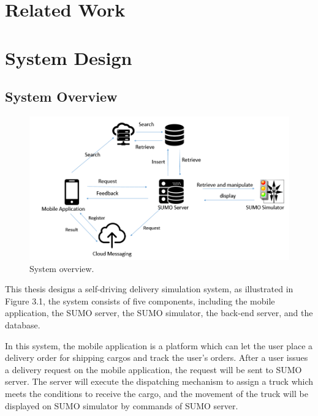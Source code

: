 \documentclass[12pt]{ksthesis}
\begin{document}
\begin{thesis}
{  


\chapter{Related Work} \label{Chap:Related}




\chapter{System Design}\label{Chap:Architecture}

\section{System Overview}

\begin{figure}[H]
\centering
\includegraphics[width=1.0\textwidth]{./figures/F3-1_SystemOverview.PNG}
\caption{\large System overview.}
\vspace{0.5cm}
\label{Fig:system_Overview}
\end{figure}

This thesis designs a self-driving delivery simulation system, as illustrated in Figure 3.1, the system consists of five components, including the mobile application, the SUMO server, the SUMO simulator, the back-end server, and the database. 

In this system, the mobile application is a platform which can let the user place a delivery order for shipping cargos and track the user’s orders. After a user issues a delivery request on the mobile application, the request will be sent to SUMO server. The server will execute the dispatching mechanism to assign a truck which meets the conditions to receive the cargo, and the movement of the truck will be displayed on SUMO simulator by commands of SUMO server. 

}
\end{thesis}
\end{document}
